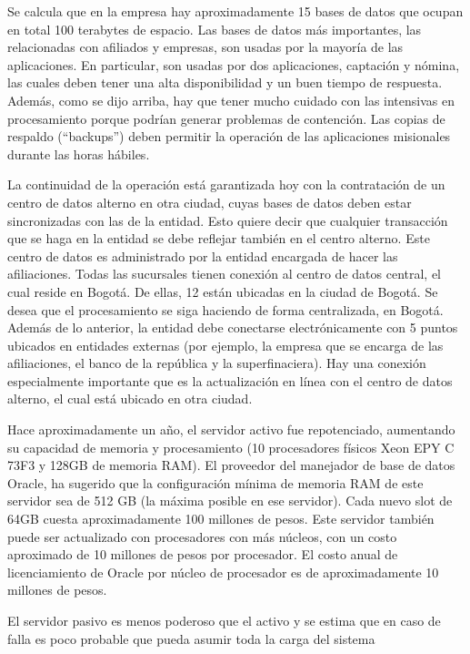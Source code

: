 \documentclass[a4paper]{article}
\begin{document}
Se calcula que en la empresa hay aproximadamente 15 bases de datos que ocupan en total 100 terabytes de
espacio. Las bases de datos más importantes, las relacionadas con afiliados y empresas, son usadas por la mayoría
de las aplicaciones. En particular, son usadas por dos aplicaciones, captación y nómina, las cuales deben tener una
alta disponibilidad y un buen tiempo de respuesta. Además, como se dijo arriba, hay que tener mucho cuidado con
las intensivas en procesamiento porque podrían generar problemas de contención.
Las copias de respaldo (“backups”) deben permitir la operación de las aplicaciones misionales durante las horas
hábiles.

La continuidad de la operación está garantizada hoy con la contratación de un centro de datos alterno en otra
ciudad, cuyas bases de datos deben estar sincronizadas con las de la entidad. Esto quiere decir que cualquier
transacción que se haga en la entidad se debe reflejar también en el centro alterno. Este centro de datos es
administrado por la entidad encargada de hacer las afiliaciones.
Todas las sucursales tienen conexión al centro de datos central, el cual reside en Bogotá. De ellas, 12 están ubicadas
en la ciudad de Bogotá. Se desea que el procesamiento se siga haciendo de forma centralizada, en Bogotá.
Además de lo anterior, la entidad debe conectarse electrónicamente con 5 puntos ubicados en entidades externas
(por ejemplo, la empresa que se encarga de las afiliaciones, el banco de la república y la superfinaciera). Hay una
conexión especialmente importante que es la actualización en línea con el centro de datos alterno, el cual está
ubicado en otra ciudad.

Hace aproximadamente un año, el servidor activo fue repotenciado, aumentando su capacidad de memoria y
procesamiento (10 procesadores físicos Xeon EPY C 73F3 y 128GB de memoria RAM). El proveedor del manejador
de base de datos Oracle, ha sugerido que la configuración mínima de memoria RAM de este servidor sea de 512 GB
(la máxima posible en ese servidor). Cada nuevo slot de 64GB cuesta aproximadamente 100 millones de pesos. Este
servidor también puede ser actualizado con procesadores con más núcleos, con un costo aproximado de 10 millones
de pesos por procesador. El costo anual de licenciamiento de Oracle por núcleo de procesador es de
aproximadamente 10 millones de pesos.

El servidor pasivo es menos poderoso que el activo y se estima que en caso de falla es poco probable que pueda
asumir toda la carga del sistema
\end{document}
